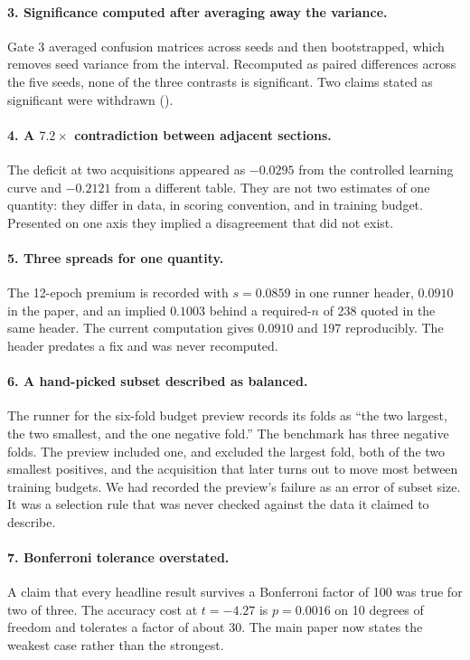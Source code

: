 \documentclass[10pt,twocolumn,letterpaper]{article}
\begin{document}
\paragraph{3. Significance computed after averaging away the variance.} Gate 3
averaged confusion matrices across seeds and then bootstrapped, which removes seed
variance from the interval. Recomputed as paired differences across the five seeds,
none of the three contrasts is significant. Two claims stated as significant were
withdrawn ().

\paragraph{4. A $7.2\times$ contradiction between adjacent sections.} The deficit at
two acquisitions appeared as $-0.0295$ from the controlled learning curve and
$-0.2121$ from a different table. They are not two estimates of one quantity: they
differ in data, in scoring convention, and in training budget. Presented on one axis
they implied a disagreement that did not exist.

\paragraph{5. Three spreads for one quantity.} The 12-epoch premium is recorded with
$s = 0.0859$ in one runner header, $0.0910$ in the paper, and an implied $0.1003$
behind a required-$n$ of 238 quoted in the same header. The current computation gives
$0.0910$ and 197 reproducibly. The header predates a fix and was never recomputed.

\paragraph{6. A hand-picked subset described as balanced.} The runner for the
six-fold budget preview records its folds as ``the two largest, the two smallest, and
the one negative fold.'' The benchmark has three negative folds. The preview included
one, and excluded the largest fold, both of the two smallest positives, and the
acquisition that later turns out to move most between training budgets. We had
recorded the preview's failure as an error of subset size. It was a selection rule
that was never checked against the data it claimed to describe.

\paragraph{7. Bonferroni tolerance overstated.} A claim that every headline result
survives a Bonferroni factor of 100 was true for two of three. The accuracy cost at
$t = -4.27$ is $p = 0.0016$ on 10 degrees of freedom and tolerates a factor of about
30. The main paper now states the weakest case rather than the strongest.
\end{document}
